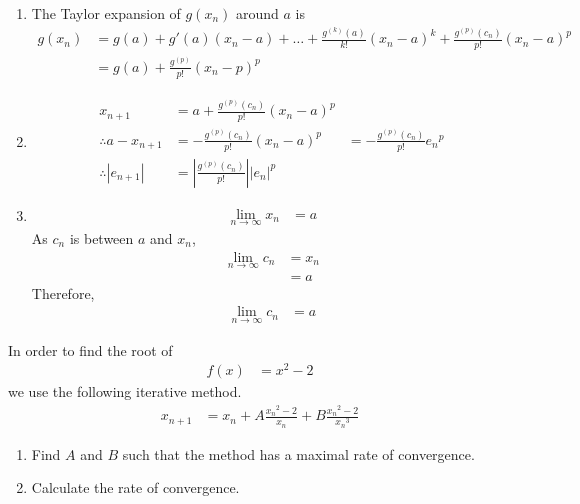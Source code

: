 \documentclass[fleqn, a4paper, 11pt, oneside]{amsart}
\theoremstyle{definition}
\theoremstyle{theorem}
\begin{document}
\begin{solution}
	\begin{enumerate}[leftmargin=*]
		\item
			The Taylor expansion of $g(x_n)$ around $a$ is
			\begin{align*}
				g(x_n) & = g(a) + g'(a) (x_n - a) + \dots + \frac{g^{(k)}(a)}{k!} (x_n - a)^k + \frac{g^{(p)}(c_n)}{p!} (x_n - a)^p \\
                                       & = g(a) + \frac{g^{(p)}}{p!} (x_n - p)^p
			\end{align*}
		\item
			\begin{align*}
				x_{n + 1}                & = a + \frac{g^{(p)}(c_n)}{p!} (x_n - a)^p \\
				\therefore a - x_{n + 1} & = -\frac{g^{(p)}(c_n)}{p!} (x_n - a)^p
                                                         & = -\frac{g^{(p)}(c_n)}{p!} {e_n}^p        \\
				\therefore |e_{n + 1}|   & = \left| \frac{g^{(p)}(c_n)}{p!} \right| |e_n|^p
			\end{align*}
		\item
			\begin{align*}
				\lim\limits_{n \to \infty} x_n & = a
			\end{align*}
			As $c_n$ is between $a$ and $x_n$,
			\begin{align*}
				\lim\limits_{n \to \infty} c_n & = x_n \\
                                                               & = a
			\end{align*}
			Therefore,
			\begin{align*}
				\lim\limits_{n \to \infty} c_n & = a
			\end{align*}
	\end{enumerate}
\end{solution}

\begin{question}
	In order to find the root of
	\begin{align*}
		f(x) & = x^2 - 2
	\end{align*}
	we use the following iterative method.
	\begin{align*}
		x_{n + 1} & = x_n + A \frac{{x_n}^2 - 2}{x_n} + B \frac{{x_n}^2 - 2}{{x_n}^3}
	\end{align*}
	\begin{enumerate}
		\item Find $A$ and $B$ such that the method has a maximal rate of convergence.
		\item Calculate the rate of convergence.
	\end{enumerate}
\end{question}
\end{document}

